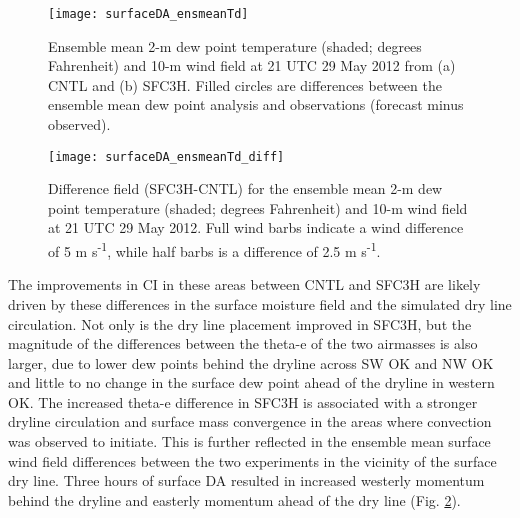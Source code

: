 \begin{figure}
\centering
\texttt{[image: surfaceDA\_ensmeanTd]}
\caption{Ensemble mean 2-m dew point temperature (shaded; degrees Fahrenheit) and 10-m wind field at 21 UTC 29 May 2012 from (a) CNTL and (b) SFC3H. Filled circles are differences between the ensemble mean dew point analysis and observations (forecast minus observed). }
\label{sfcmeantd}
\end{figure}
\begin{figure}
\centering
\texttt{[image: surfaceDA\_ensmeanTd\_diff]}
\caption{Difference field (SFC3H-CNTL) for the ensemble mean 2-m dew point temperature (shaded; degrees Fahrenheit) and 10-m wind field at 21 UTC 29 May 2012. Full wind barbs indicate a wind difference of 5 m s\textsuperscript{-1}, while half barbs is a difference of 2.5 m s\textsuperscript{-1}. }
\label{sfcmeantddiff}
\end{figure}

The improvements in CI in these areas between CNTL and SFC3H are likely driven by these differences in the surface moisture field and the simulated dry line circulation. Not only is the dry line placement improved in SFC3H, but the magnitude of the differences between the theta-e of the two airmasses is also larger, due to lower dew points behind the dryline across SW OK and NW OK and little to no change in the surface dew point ahead of the dryline in western OK. The increased theta-e difference in SFC3H is associated with a stronger dryline circulation and surface mass convergence in the areas where convection was observed to initiate. This is further reflected in the ensemble mean surface wind field differences between the two experiments in the vicinity of the surface dry line. Three hours of surface DA resulted in increased westerly momentum behind the dryline and easterly momentum ahead of the dry line (Fig. \ref{sfcmeantddiff}).


